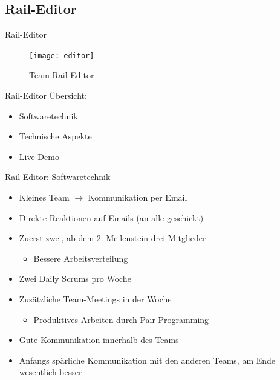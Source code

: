 \subsection{Rail-Editor}

\begin{frame}{Rail-Editor}

\begin{figure}
  \begin{center}
    \leavevmode
      \texttt{[image: editor]}
    \caption{Team Rail-Editor}
  \end{center}
\end{figure}

\end{frame}

\begin{frame}{Rail-Editor}
	Übersicht:
	\begin{itemize}
		\pause
		\item Softwaretechnik
		\item Technische Aspekte
		\item Live-Demo
	\end{itemize}
\end{frame}

\begin{frame}{Rail-Editor: Softwaretechnik}
	\pause
	\begin{itemize}
	\item Kleines Team $\rightarrow$ Kommunikation per Email
	\pause
	\item Direkte Reaktionen auf Emails (an alle geschickt)
	\pause
	\item Zuerst zwei, ab dem 2. Meilenstein drei Mitglieder
	\begin{itemize}
	\item Bessere Arbeitsverteilung
	\end{itemize}
	\pause
	\item Zwei Daily Scrums pro Woche
	\pause
	\item Zusätzliche Team-Meetings in der Woche
	\begin{itemize}
	\item Produktives Arbeiten durch Pair-Programming
	\end{itemize}
	\pause
	\item Gute Kommunikation innerhalb des Teams
	\pause
	\item Anfangs spärliche Kommunikation mit den anderen Teams, am Ende wesentlich besser
	\end{itemize}
\end{frame}

